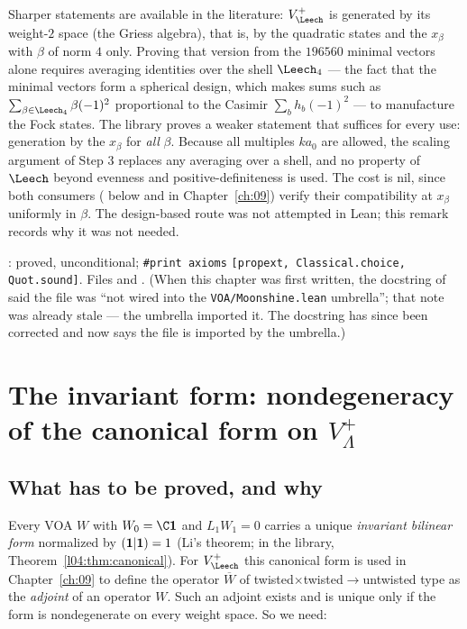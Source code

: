 \begin{remark}\label{ch04:rem:design}
Sharper statements are available in the literature: $V_\Leech^+$ is generated by its weight-$2$
space (the Griess algebra), that is, by the quadratic states and the $x_\beta$ with $\beta$ of norm $4$
only. Proving that version from the $196560$ minimal vectors alone requires averaging identities over
the shell $\Leech_4$ --- the fact that the minimal vectors form a spherical design, which makes sums
such as $\sum_{\beta\in\Leech_4}\beta(-1)^2$ proportional to the Casimir $\sum_bh_b(-1)^2$ --- to manufacture
the Fock states. The library proves a weaker statement that suffices for every use: generation by the
$x_\beta$ for \emph{all} $\beta$. Because all multiples $ka_0$ are allowed, the scaling argument of Step 3
replaces any averaging over a shell, and no property of $\Leech$ beyond evenness and
positive-definiteness is used. The cost is nil, since both consumers ( below
and  in Chapter~\ref{ch:09}) verify their compatibility at $x_\beta$ uniformly
in $\beta$. The design-based route was not attempted in Lean; this remark records why it was not needed.
\end{remark}

\begin{status}
: proved, unconditional; \texttt{\#print axioms}
\texttt{[propext, Classical.choice, Quot.sound]}. Files 
and . (When this chapter was first written, the docstring of  said the file
was ``not wired into the \texttt{VOA/Moonshine.lean} umbrella''; that note was already stale --- the umbrella
imported it. The docstring has since been corrected and now says the file is imported by the umbrella.)
\end{status}
\section{The invariant form: nondegeneracy of the canonical form on \texorpdfstring{$V_\Lambda^+$}{V+}}\label{ch04:sec:form}

\subsection{What has to be proved, and why}

Every VOA $W$ with $W_0=\C\chfourone$ and $L_1W_1=0$ carries a unique \emph{invariant bilinear form}
normalized by $(\mathbf{1}|\mathbf{1})=1$ (Li's theorem; in the library, Theorem~\ref{l04:thm:canonical}). For
$V_\Leech^+$ this canonical form is used in Chapter~\ref{ch:09} to define the operator $\overline W$ of
twisted$\times$twisted$\to$untwisted type as the \emph{adjoint} of an operator $W$. Such an adjoint
exists and is unique only if the form is nondegenerate on every weight space. So we need:

